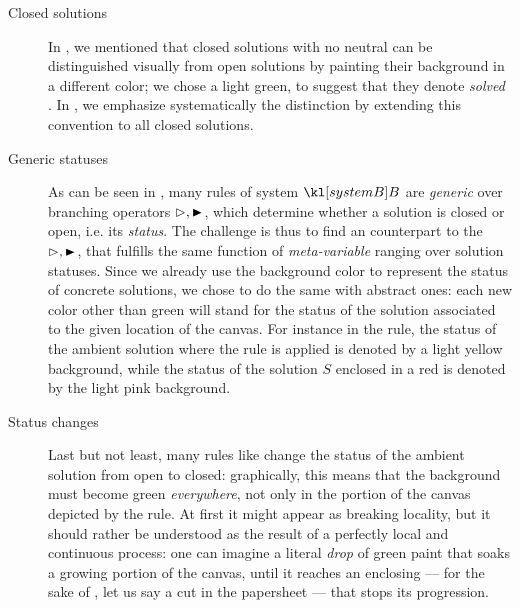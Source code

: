 \begin{description}
  \item[Closed solutions] In , we mentioned that closed
solutions with no neutral  can be distinguished visually from open
solutions by painting their background in a different color; we chose a light
green, to suggest that they denote \emph{solved} . In
, we emphasize systematically the distinction by extending
this convention to all closed solutions.
  \item[Generic statuses] As can be seen in , many rules of
system $\sysB$ are \emph{generic} over branching operators $\J, \JB$, which
determine whether a solution is closed or open, i.e. its \emph{status}. The
challenge is thus to find an  counterpart to the  $\J, \JB$, that
fulfills the same function of \emph{meta-variable} ranging over solution
statuses. Since we already use the background color to represent the status of
concrete solutions, we chose to do the same with abstract ones: each new color
other than green will stand for the status of the solution associated to the
given location of the canvas. For instance in the 
rule, the status of the ambient solution where the rule is applied is denoted by
a light yellow background, while the status of the solution $S$ enclosed in a
red  is denoted by the light pink background.
  \item[Status changes] Last but not least, many rules like  change
the status of the ambient solution from open to closed: graphically, this means
that the background must become green \emph{everywhere}, not only in the portion
of the canvas depicted by the rule. At first it might appear as breaking
locality, but it should rather be understood as the result of a perfectly local
and continuous process: one can imagine a literal \emph{drop} of green paint
that soaks a growing portion of the canvas, until it reaches an enclosing 
--- for the sake of , let us say a cut in the papersheet --- that
stops its progression.
\end{description}

